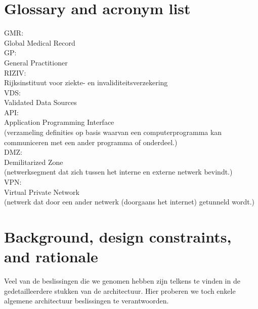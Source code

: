 \documentclass[a4paper,10pt]{article}
\begin{document}

\clearpage
\section{Glossary and acronym list}
GMR:\\
Global Medical Record\\

GP:\\
General Practitioner\\

RIZIV:\\
Rijksinstituut voor ziekte- en invaliditeitsverzekering\\

VDS:\\
Validated Data Sources\\

API:\\
Application Programming Interface\\
(verzameling definities op basis waarvan een computerprogramma kan communiceren met een ander programma of onderdeel.)\\

DMZ:\\
Demilitarized Zone\\
(netwerksegment dat zich tussen het interne en externe netwerk bevindt.)\\

VPN:\\
Virtual Private Network\\
(netwerk dat door een ander netwerk (doorgaans het internet) getunneld wordt.)\\


\clearpage
\section{Background, design constraints, and rationale}
Veel van de beslissingen die we genomen hebben zijn telkens te vinden in de gedetailleerdere stukken van de architectuur.  Hier proberen we toch enkele algemene architectuur beslissingen te verantwoorden.\\
\end{document}
